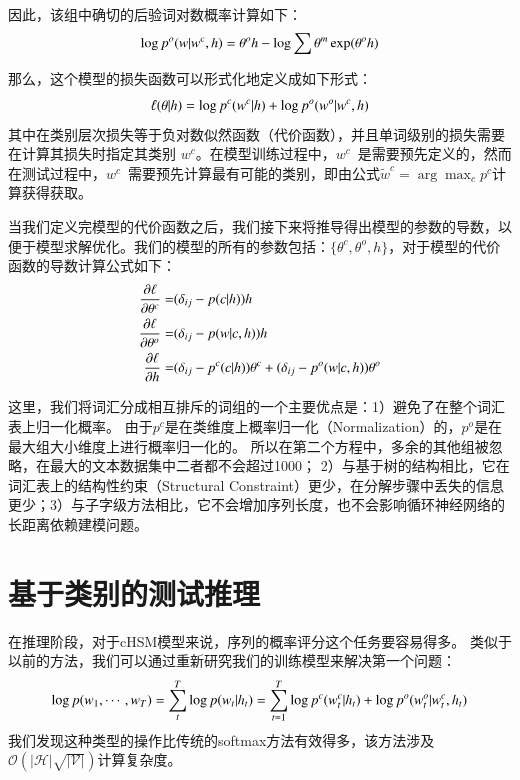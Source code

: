  因此，该组中确切的后验词对数概率计算如下：
\begin{equation}
\setlength{\abovedisplayskip}{6pt}
\setlength{\belowdisplayskip}{6pt}
  \log p^o(w|w^c,h)=\theta^o h -\log\sum\theta^m\exp(\theta^o h)
\end{equation}

那么，这个模型的损失函数可以形式化地定义成如下形式：
\begin{equation}
\setlength{\abovedisplayskip}{6pt}
\setlength{\belowdisplayskip}{6pt}
\ell(\theta|h) =\log p^c(w^c|h) +\log p^o(w^o|w^c,h)
\end{equation}
其中在类别层次损失等于负对数似然函数（代价函数），并且单词级别的损失需要在计算其损失时指定其类别 $ w ^ c $。在模型训练过程中，$ w^c$~是需要预先定义的，然而在测试过程中，$w^c$~需要预先计算最有可能的类别，即由公式$\tilde w^c=\arg\max_c p^c$计算获得获取。

当我们定义完模型的代价函数之后，我们接下来将推导得出模型的参数的导数，以便于模型求解优化。我们的模型的所有的参数包括：$\{\theta^c,\theta^o,h\}$，对于模型的代价函数的导数计算公式如下：
\begin{equation}
\setlength{\abovedisplayskip}{6pt}
\setlength{\belowdisplayskip}{6pt}
\begin{split}
\frac{\partial \ell}{\partial \theta^c}=& (\delta_{ij}-p(c|h))h \\
\frac{\partial \ell}{\partial \theta^o}=&(\delta_{ij}-p(w|c,h))h \\
\frac{\partial \ell}{\partial h}=&(\delta_{ij}-p^c(c|h))\theta^c + (\delta_{ij}-p^o(w|c,h))\theta^o
\end{split}
\end{equation}

这里，我们将词汇分成相互排斥的词组的一个主要优点是：1）避免了在整个词汇表上归一化概率。 由于$p^c$是在类维度上概率归一化（Normalization）的，$p^o$是在最大组大小维度上进行概率归一化的。 所以在第二个方程中，多余的其他组被忽略，在最大的文本数据集中二者都不会超过1000； 2）与基于树的结构相比，它在词汇表上的结构性约束（Structural Constraint）更少，在分解步骤中丢失的信息更少；3）与子字级方法相比，它不会增加序列长度，也不会影响循环神经网络的长距离依赖建模问题。



\section{基于类别的测试推理}
在推理阶段，对于cHSM模型来说，序列的概率评分这个任务要容易得多。
类似于以前的方法，我们可以通过重新研究我们的训练模型来解决第一个问题：
\begin{equation}\label{equ:class_inf}
\setlength{\abovedisplayskip}{6pt}
\setlength{\belowdisplayskip}{6pt}
\log p(w_1,\cdots, w_T)=\sum_t^T\log p(w_t|h_t) =\sum_{t=1}^{T}\log p^c(w^c_t|h_t) +\log p^o(w^o_t|w^c_t,h_t)
\end{equation}
我们发现这种类型的操作比传统的softmax方法有效得多，该方法涉及$ \mathcal{O(|H|\sqrt{|\mathcal{V}|})}$计算复杂度。

